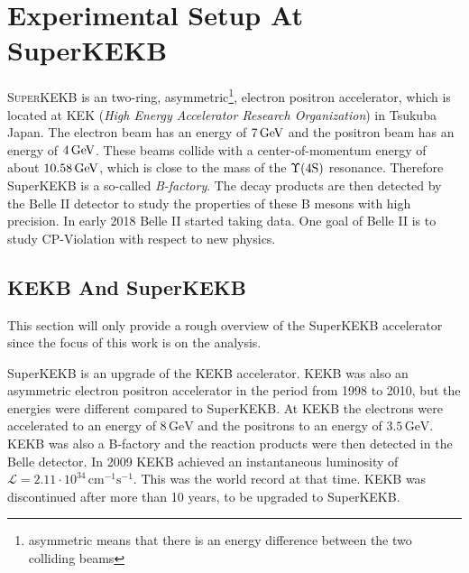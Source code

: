 \documentclass[a4paper,11pt,twosided,final,german,openbib,pdftex,listof=totoc,bibliography=totoc]{scrbook}
\begin{document}
\chapter{Experimental Setup At SuperKEKB}
\label{sec:SetupKEK}

\lettrine{S}{uperKEKB} is an two-ring, asymmetric\footnote{asymmetric means that there is an energy difference between the two colliding beams}, electron positron accelerator, which is located at KEK (\textit{High Energy Accelerator Research Organization}) in Tsukuba Japan. 
The electron beam has an energy of $7\,\textnormal{GeV}$ 
and the positron beam has an energy of $4\,\textnormal{GeV}$. These beams collide with a center-of-momentum energy of about $10.58\,\textnormal{GeV}$, which is close to the mass of the $\Upsilon(4\textnormal{S})$ resonance. Therefore SuperKEKB is a so-called \textit{B-factory}. The decay products are then detected by the  Belle II detector to study the properties of these B mesons with high precision. In early 2018 Belle II started taking data. One goal of Belle II is to study CP-Violation with respect to new physics.\cite{B2B}

\section{KEKB And SuperKEKB}
\label{sec:KEK}
This section will only provide a rough overview of the SuperKEKB accelerator since the focus of this work is on the analysis. 

SuperKEKB is an upgrade of the KEKB accelerator. KEKB was also an asymmetric electron positron accelerator in the period from 1998 to 2010, but the energies were different compared to SuperKEKB. At KEKB the electrons were accelerated to an energy of $8\,\textrm{GeV}$ and the positrons to an energy of $3.5\,\textrm{GeV}$. KEKB was also a B-factory and the reaction products were then detected in the Belle detector. In 2009 KEKB achieved an instantaneous luminosity of $\mathcal{L} = 2.11 \cdot 10^{34}\,\textrm{cm}^{-1}\textrm{s}^{-1}$. This was the world record at that time. KEKB was discontinued after more than 10 years, to be upgraded to SuperKEKB.\cite{PTEP}
\end{document}
